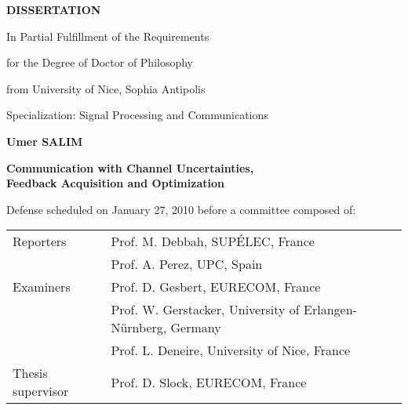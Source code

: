 \begin{center}
  \Large
  \par


      \vspace{1cm}
      {\bf DISSERTATION}


      \large In Partial Fulfillment of the Requirements

      for the Degree of Doctor of Philosophy

      from University of Nice, Sophia Antipolis

      \vspace{.5cm}
      Specialization: Signal Processing and Communications

      \Large
      \vspace{1cm}
      {\bf Umer SALIM}

      \vspace{.5cm}
      {\bf Communication with Channel Uncertainties, \\
      Feedback Acquisition and Optimization}

      \vspace{.5cm} %

\vspace{1cm}
\normalsize


 Defense scheduled on January 27, 2010 before a committee composed of: \\

 \vspace{1cm}
 \mbox{}
 \begin{tabular}{ll}
    Reporters & Prof. M. Debbah, SUP\'{E}LEC, France  \\
              & Prof. A. Perez, UPC, Spain \\
  Examiners & Prof. D. Gesbert, EURECOM, France \\
            & Prof. W. Gerstacker, University of Erlangen-N\"{u}rnberg, Germany \\
            & Prof. L. Deneire, University of Nice, France \\
  Thesis supervisor & Prof. D. Slock, EURECOM, France \\
\end{tabular}
\end{center}

\normalsize
